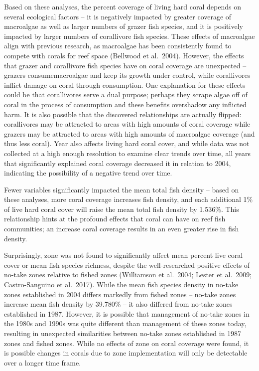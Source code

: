 \documentclass[12pt,]{article}
\begin{document}
Based on these analyses, the percent coverage of living hard coral
depends on several ecological factors -- it is negatively impacted by
greater coverage of macroalgae as well as larger numbers of grazer fish
species, and it is positively impacted by larger numbers of corallivore
fish species. These effects of macroalgae align with previous research,
as macroalgae has been consistently found to compete with corals for
reef space (Bellwood et al.~2004). However, the effects that grazer and
corallivore fish species have on coral coverage are unexpected --
grazers consumemacroalgae and keep its growth under control, while
corallivores inflict damage on coral through consumption. One
explanation for these effects could be that corallivores serve a dual
purpose; perhaps they scrape algae off of coral in the process of
consumption and these benefits overshadow any inflicted harm. It is also
possible that the discovered relationships are actually flipped:
corallivores may be attracted to areas with high amounts of coral
coverage while grazers may be attracted to areas with high amounts of
macroalgae coverage (and thus less coral). Year also affects living hard
coral cover, and while data was not collected at a high enough
resolution to examine clear trends over time, all years that
significantly explained coral coverage decreased it in relation to 2004,
indicating the possibility of a negative trend over time.

Fewer variables significantly impacted the mean total fish density --
based on these analyses, more coral coverage increases fish density, and
each additional 1\% of live hard coral cover will raise the mean total
fish density by 1.536\%. This relationship hints at the profound effects
that coral can have on reef fish communities; an increase coral coverage
results in an even greater rise in fish density.

Surprisingly, zone was not found to significantly affect mean percent
live coral cover or mean fish species richness, despite the
well-researched positive effects of no-take zones relative to fished
zones (Williamson et al.~2004; Lester et al.~2009; Castro-Sanguino et
al.~2017). While the mean fish species density in no-take zones
established in 2004 differs markedly from fished zones -- no-take zones
increase mean fish density by 39.780\% -- it also differed from no-take
zones established in 1987. However, it is possible that management of
no-take zones in the 1980s and 1990s was quite different than management
of these zones today, resulting in unexpected similarities between
no-take zones established in 1987 zones and fished zones. While no
effects of zone on coral coverage were found, it is possible changes in
corals due to zone implementation will only be detectable over a longer
time frame.
\end{document}
